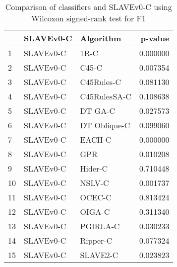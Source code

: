 \begin{table}
\footnotesize
\caption{Comparison of classifiers and SLAVEv0-C using Wilcoxon signed-rank test for F1}
\label{tab:SLAVEv0-C wilcoxon F1 comparison}
\begin{tabular}{lllr}
\hline
 & SLAVEv0-C & Algorithm & p-value \\
\hline
1 & SLAVEv0-C & 1R-C & 0.000000 \\
2 & SLAVEv0-C & C45-C & 0.007354 \\
3 & SLAVEv0-C & C45Rules-C & 0.081130 \\
4 & SLAVEv0-C & C45RulesSA-C & 0.108638 \\
5 & SLAVEv0-C & DT GA-C & 0.027573 \\
6 & SLAVEv0-C & DT Oblique-C & 0.099060 \\
7 & SLAVEv0-C & EACH-C & 0.000000 \\
8 & SLAVEv0-C & GPR & 0.010208 \\
9 & SLAVEv0-C & Hider-C & 0.710448 \\
10 & SLAVEv0-C & NSLV-C & 0.001737 \\
11 & SLAVEv0-C & OCEC-C & 0.813424 \\
12 & SLAVEv0-C & OIGA-C & 0.311340 \\
13 & SLAVEv0-C & PGIRLA-C & 0.030233 \\
14 & SLAVEv0-C & Ripper-C & 0.077324 \\
15 & SLAVEv0-C & SLAVE2-C & 0.023823 \\
\hline
\end{tabular}
\end{table}
